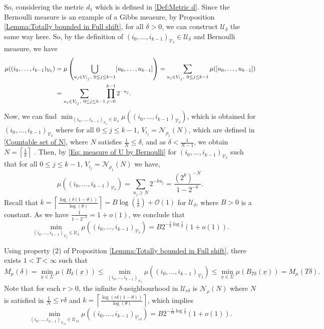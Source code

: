 \documentclass[11pt, reqno]{amsart}
\theoremstyle{plain}%
\theoremstyle{definition}
\theoremstyle{definition}
\def\U{\ensuremath{\mathcal U}}
\def\st{such that }
\def\ulx{\underline{x}}
\numberwithin{equation}{section}
\begin{document}
So, considering the metric $d_1$ which is defined in \eqref{Def:Metric d}. Since the Bernoulli measure is an example of a Gibbs measure, by Proposition \ref{Lemma:Totally bounded in Full shift}, for all $\delta>0$, we can construct $\U_\delta$ the same way here. So, by the definition of $(i_0,\ldots,i_{k-1})_{\mathcal{V}_{\delta}}\in \U_\delta$ and Bernoulli measure, we have 
\begin{align}\label{Eq: measure of U by Bernoulli}
 \notag \mu((i_0,\ldots,i_{k-1})_{\mathcal{V}_{\delta}})&=\mu\left(\bigcup_{u_j\in V_{i_j},\ 0\le j\le k-1} [u_0,\ldots,u_{k-1}]\right)= \sum_{u_j\in V_{i_j},\ 0\le j\le k-1}\mu([u_0,\ldots,u_{k-1}])\\&= \sum_{u_j\in V_{i_j},\ 0\le j\le k-1} \prod_{j=0}^{k-1} 2^{-u_j}.  
\end{align}
Now, we can find $\min_{(i_0,\ldots,i_{k-1})_{\mathcal{V}_{\delta}}\in \U_\delta}\mu((i_0,\ldots,i_{k-1})_{\mathcal{V}_{\delta}})$, which is obtained for $(i_0,\ldots,i_{k-1})_{\mathcal{V}_{\delta}}$ where for all $0\le j\le k-1$, $V_{i_j}=\mathcal{N}_{\rho_1}(N)$, which are defined in \eqref{Countable set of N}, where $N$ satisfies $\frac{1}{N}\le\delta$, and as $\delta<\frac{1}{N-1}$, we obtain $N=\left\lceil\frac{1}{\delta}\right\rceil$ . Then, by \eqref{Eq: measure of U by Bernoulli} for $(i_0,\ldots,i_{k-1})_{\mathcal{V}_{\delta}}$ \st  for all $0\le j\le k-1$, $V_{i_j}=\mathcal{N}_{\rho_1}(N)$ we have,
\begin{equation*}\label{approx: mu of N-tail in example}
    \mu((i_0,\ldots,i_{k-1})_{\mathcal{V}_{\delta}})=  \sum_{u_j\ge N}  2^{-ku_j}=\frac{\left(2^k\right)^{-N}}{1-2^{-k}}.
\end{equation*}
Recall that $k=\left\lceil \frac{\log(\delta(1-\theta))}{\log(\theta)}\right\rceil= B\log\left(\frac{1}{\delta}\right)+\mathcal{O}(1)$ for $\U_\delta$, where $B>0$ is a constant. As we have $\frac{1}{1-2^{-k}}=1+o(1)$, we conclude that 
$$\min_{(i_0,\ldots,i_{k-1})_{\mathcal{V}_{\delta}}\in \U_\delta}\mu((i_0,\ldots,i_{k-1})_{\mathcal{V}_{\delta}})= B2^{-\frac{1}{\delta}\log\frac{1}{\delta}}(1+o(1)).$$

Using property (2) of Proposition \ref{Lemma:Totally bounded in Full shift}, there exists $1< T<\infty$ \st  
$$ M_\mu(\delta)=\min_{\ulx\in \Sigma}\mu(B_{\delta}(\ulx))\le \min_{(i_0,\ldots,i_{k-1})_{\mathcal{V}_{\delta}}} \mu((i_0,\ldots,i_{k-1})_{\mathcal{V}_{\delta}})\le \min_{\ulx\in \Sigma}\mu(B_{T\delta}(\ulx))=M_\mu(T\delta).$$
Note that for each $r>0$, the infinite $\delta$-neighbourhood in $\U_{r\delta}$ is $\mathcal{N}_\rho(N)$ where $N$ is satisfied in $\frac{1}{N}\le r\delta$ and $k=\left\lceil \frac{\log(r\delta(1-\theta))}{\log(\theta)}\right\rceil $, which implies \begin{equation}\label{approx: min on epsilon}
\min_{(i_0,\ldots,i_{k-1})_{\mathcal{V}_{r\delta}}\in \U_{r\delta}}\mu((i_0,\ldots,i_{k-1})_{\mathcal{V}_{r\delta}})= B2^{-\frac{1}{r\delta}\log\frac{1}{\delta}}(1+o(1)).\end{equation}
\end{document}
